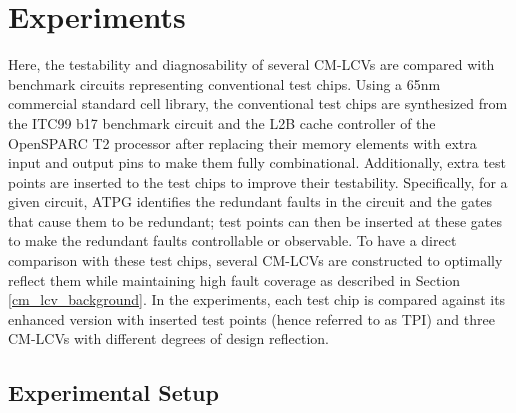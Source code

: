 \documentclass[journal]{IEEEtran}
\begin{document}
\section{Experiments} \label{exp}

Here, the testability and diagnosability of several CM-LCVs are compared with benchmark circuits representing conventional test chips. Using a 65nm commercial standard cell library, the conventional test chips are synthesized from the ITC99 b17 benchmark circuit \cite{itc99} and the L2B cache controller of the OpenSPARC T2 processor after replacing their memory elements with extra input and output pins to make them fully combinational. Additionally, extra test points are inserted to the test chips to improve their testability. Specifically, for a given circuit, ATPG identifies the redundant faults in the circuit and the gates that cause them to be redundant; test points can then be inserted at these gates to make the redundant faults controllable or observable. To have a direct comparison with these test chips, several CM-LCVs are constructed to optimally reflect them while maintaining high fault coverage as described in Section \ref{cm_lcv_background}. In the experiments, each test chip is compared against its enhanced version with inserted test points (hence referred to as TPI) and three CM-LCVs with different degrees of design reflection.

\subsection{Experimental Setup} \label{exp_setup}
\end{document}
